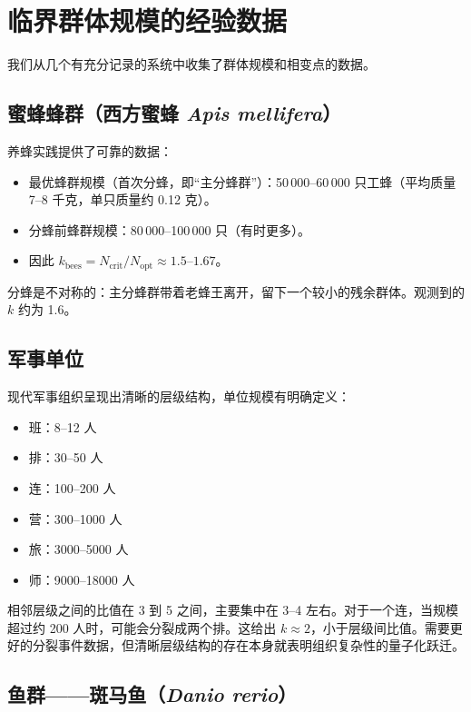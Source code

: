 \documentclass[12pt]{article}
\theoremstyle{remark}
\begin{document}
	\section{临界群体规模的经验数据}
	\label{sec:data}
	
	我们从几个有充分记录的系统中收集了群体规模和相变点的数据。
	
	\subsection{蜜蜂蜂群（西方蜜蜂 \textit{Apis mellifera}）}
	\label{subsec:bees}
	
	养蜂实践提供了可靠的数据：
	\begin{itemize}
		\item 最优蜂群规模（首次分蜂，即“主分蜂群”）：50\,000–60\,000 只工蜂（平均质量 7–8 千克，单只质量约 0.12 克）。\cite{Seeley2010, Winston1987}
		\item 分蜂前蜂群规模：80\,000–100\,000 只（有时更多）。\cite{bees}
		\item 因此 $k_{\text{bees}} = N_{\text{crit}}/N_{\text{opt}} \approx 1.5$–$1.67$。
	\end{itemize}
	分蜂是不对称的：主分蜂群带着老蜂王离开，留下一个较小的残余群体。观测到的 $k$ 约为 1.6。
	
	\subsection{军事单位}
	\label{subsec:military}
	
	现代军事组织呈现出清晰的层级结构，单位规模有明确定义\cite{FM3-90.5}：
	\begin{itemize}
		\item 班：8–12 人
		\item 排：30–50 人
		\item 连：100–200 人
		\item 营：300–1000 人
		\item 旅：3000–5000 人
		\item 师：9000–18000 人
	\end{itemize}
	相邻层级之间的比值在 3 到 5 之间，主要集中在 3–4 左右。对于一个连，当规模超过约 200 人时，可能会分裂成两个排。这给出 $k \approx 2$，小于层级间比值。需要更好的分裂事件数据，但清晰层级结构的存在本身就表明组织复杂性的量子化跃迁。
	
	\subsection{鱼群——斑马鱼（\textit{Danio rerio}）}
	\label{subsec:fish}
	
\end{document}
